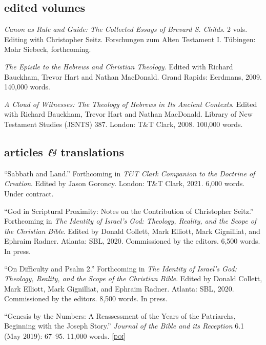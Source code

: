 \documentclass[11pt]{article}
\newcommand{\amper}{\emph{\&}}
\newcommand{\doi}[1]{\href{https://doi.org/#1}{\footnotesize\textsc{[doi]}}}
\newcommand{\years}[1]{\marginnote{\footnotesize #1}}
\begin{document}
\subsection*{edited volumes}

\years{2020}
\emph{Canon as Rule and Guide: The Collected Essays of Brevard S.
Childs}. 2 vols. Editing with Christopher Seitz. Forschungen zum Alten
Testament I. Tübingen: Mohr Siebeck, forthcoming.

\years{2009}
\emph{The Epistle to the Hebrews and Christian Theology}. Edited with
Richard Bauckham, Trevor Hart and Nathan MacDonald. Grand Rapids:
Eerdmans, 2009. 140,000 words.

\years{2008}
\emph{A Cloud of Witnesses: The Theology of Hebrews in Its Ancient
Contexts}. Edited with Richard Bauckham, Trevor Hart and Nathan
MacDonald. Library of New Testament Studies (JSNTS) 387. London: T\&T
Clark, 2008. 100,000 words.

\subsection*{articles \amper{} translations}

\years{2021}
``Sabbath and Land.'' Forthcoming in \emph{T\&T Clark Companion to the
Doctrine of Creation}. Edited by Jason Goroncy. London: T\&T Clark,
2021. 6,000 words. Under contract.

\years{2020}
``God in Scriptural Proximity: Notes on the Contribution of Christopher
Seitz.'' Forthcoming in \emph{The Identity of Israel’s God: Theology,
Reality, and the Scope of the Christian Bible}. Edited by Donald
Collett, Mark Elliott, Mark Gignilliat, and Ephraim Radner. Atlanta:
SBL, 2020. Commissioned by the editors. 6,500 words. In press.

\years{2020}
``On Difficulty and Psalm 2.'' Forthcoming in \emph{The Identity of
Israel’s God: Theology, Reality, and the Scope of the Christian Bible}.
Edited by Donald Collett, Mark Elliott, Mark Gignilliat, and Ephraim
Radner. Atlanta: SBL, 2020. Commissioned by the editors. 8,500 words. In
press.

\years{2019}
``Genesis by the Numbers: A Reassessment of the Years of the Patriarchs,
Beginning with the Joseph Story.'' \emph{Journal of the Bible and its
Reception} 6.1 (May 2019): 67–95. 11,000 words.
\doi{10.1515/jbr-2019-1003}
\end{document}
